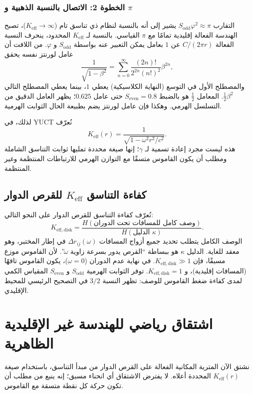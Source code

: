 \documentclass[12pt,a4paper]{article}
\newcommand{\Sodd}{S_{\mathrm{odd}}}
\newcommand{\Seven}{S_{\mathrm{even}}}
\begin{document}
	\subsubsection{الخطوة 2: الاتصال بالنسبة الذهبية و \(\pi\)}
	التقارب \(\Sodd \varphi^2 \approx \pi\) يشير إلى أنه بالنسبة لنظام ذي تناسق تام (\(K_{\mathrm{eff}} \to \infty\))، تصبح الهندسة الفعالة إقليدية تمامًا مع \(\pi\) القياسي. بالنسبة لـ \(K_{\mathrm{eff}}\) المحدود، ينحرف النسبة الفعالة \(C/(2\pi r)\) عن \(1\) بعامل يمكن التعبير عنه بواسطة \(\Sodd\) و \(\varphi\). من اللافت أن عامل لورنتز نفسه يحقق
	\[
	\frac{1}{\sqrt{1-\beta^2}} = \sum_{n=0}^{\infty} \frac{(2n)!}{2^{2n}(n!)^2} \beta^{2n},
	\]
	والمصطلح الأول في التوسع (النهاية الكلاسيكية) يعطي \(1\)، بينما يعطي المصطلح التالي \(\frac{1}{2}\beta^2\). المعامل \(\frac{1}{2}\) هو بالضبط \(\Seven = 0.8\) حتى عامل \(0.625\)؛ يظهر العامل الدقيق من التسلسل الهرمي. وهكذا فإن عامل لورنتز يضم بطبيعة الحال الثوابت الهرمية.
	
	لذلك، في YUCT نُعرّف
	\[
	\boxed{K_{\mathrm{eff}}(r) = \frac{1}{\sqrt{1 - \omega^2 r^2/c^2}}}.
	\]
	هذه ليست مجرد إعادة تسمية لـ \(\gamma\)؛ إنها صيغة محددة تمليها ثوابت التناسق الشاملة ومطلب أن يكون القاموس متسقًا مع التوازن الهرمي للارتباطات المنتظمة وغير المنتظمة.
	
	\subsection{كفاءة التناسق \(K_{\mathrm{eff}}\) للقرص الدوار}
	\label{subsec:keff-disk}
	
	نُعرّف كفاءة التناسق للقرص الدوار على النحو التالي:
	\[
	K_{\mathrm{eff,disk}} = \frac{H(\text{وصف كامل للمسافات تحت الدوران})}{H(\text{الدليل } \kappa)}.
	\]
	الوصف الكامل يتطلب تحديد جميع أزواج المسافات \(\Delta r_{ij}(\omega)\) في إطار المختبر، وهو معقد للغاية. الدليل \(\kappa\) هو ببساطة ``القرص يدور بسرعة زاوية \(\omega\)''. لأن القاموس موزع مسبقًا، فإن \(K_{\mathrm{eff,disk}} \gg 1\). في نهاية عدم الدوران (\(\omega = 0\))، يكون القاموس تافهًا (المسافات إقليدية)، و \(K_{\mathrm{eff,disk}} = 1\). توفر الثوابت الهرمية \(\Sodd\) و \(\Seven\) المقياس الكمي لمدى كفاءة ضغط القاموس للوصف: تظهر النسبة \(3/2\) في التصحيح الرئيسي للمحيط الإقليدي.
	
	\section{اشتقاق رياضي للهندسة غير الإقليدية الظاهرية}
	\label{sec:derivation}
	
	نشتق الآن المترية المكانية الفعالة على القرص الدوار من مبدأ التناسق، باستخدام صيغة \(K_{\mathrm{eff}}(r)\) المحددة أعلاه. لا يفترض الاشتقاق أي انحناء مسبق؛ إنه ينبع من مطلب أن تكون حركة كل نقطة متسقة مع القاموس.
	
\end{document}
